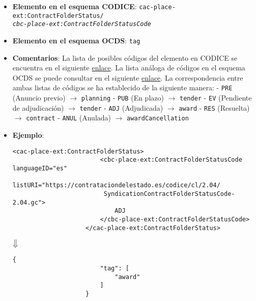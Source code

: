         \begin{itemize}
            \item \textbf{Elemento en el esquema CODICE}:
                \tabto{7.6cm} \texttt{cac-place-ext:ContractFolderStatus/} \\
                \tabto{7.6cm} \texttt{\textit{cbc-place-ext:ContractFolderStatusCode}}
            \item \textbf{Elemento en el esquema OCDS}:
                \tabto{7.6cm} \texttt{tag}
            \item \textbf{Comentarios}: La lista de posibles códigos del elemento en CODICE se encuentra en el siguiente 
                \href{https://contrataciondelestado.es/codice/cl/2.04/SyndicationContractFolderStatusCode-2.04.gc}{enlace}.
                La lista análoga de códigos en el esquema OCDS se puede consultar en el siguiente
                \href{https://standard.open-contracting.org/latest/es/schema/codelists/#release-tag}{enlace}.
                La correspondencia entre ambas listas de códigos se ha establecido de la siguiente manera:
                    \subitem - \texttt{PRE} (Anuncio previo) $\rightarrow$ \texttt{planning}
                    \subitem - \texttt{PUB} (En plazo) $\rightarrow$ \texttt{tender}
                    \subitem - \texttt{EV} (Pendiente de adjudicación) $\rightarrow$ \texttt{tender}
                    \subitem - \texttt{ADJ} (Adjudicada) $\rightarrow$ \texttt{award}
                    \subitem - \texttt{RES} (Resuelta) $\rightarrow$ \texttt{contract}
                    \subitem - \texttt{ANUL} (Anulada) $\rightarrow$ \texttt{awardCancellation}
            \item \textbf{Ejemplo}: \\
                \begin{lstlisting}[language=lXML]
                    <cac-place-ext:ContractFolderStatus>
                        <cbc-place-ext:ContractFolderStatusCode languageID="es"
                         listURI="https://contrataciondelestado.es/codice/cl/2.04/
                         SyndicationContractFolderStatusCode-2.04.gc">
                            ADJ
                        </cbc-place-ext:ContractFolderStatusCode>
                    </cac-place-ext:ContractFolderStatus>
                \end{lstlisting}
                
                \begin{center}
                    $\big\Downarrow$
                \end{center}
                
                \begin{lstlisting}[language=lJSON]
                    {
                        "tag": [
                            "award"
                        ]
                    }
                \end{lstlisting}
        \end{itemize}
        
